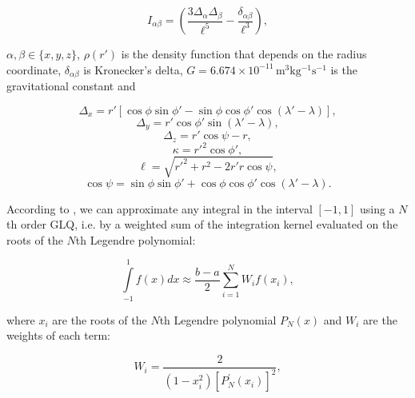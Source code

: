 \documentclass[extra]{gji}
\begin{document}
\begin{equation}
    I_{\alpha\beta} =
    \left(
        \frac{3\Delta_{\alpha} \Delta_{\beta}}{\ell^5} -
        \frac{\delta_{\alpha\beta}}{\ell^3}
    \right) ,
    \label{eq:tesseroid-tensor-kernel}
\end{equation}

\noindent $\alpha, \beta \in \{x, y, z\}$,
$\rho(r')$ is the density function that depends on the radius coordinate,
$\delta_{\alpha\beta}$ is Kronecker's delta,
$G = 6.674\times10^{-11}\, \text{m$^3$kg$^{-1}$s$^{-1}$}$ is the gravitational constant and

\begin{equation}
    \Delta_x = r'[\cos\phi\sin\phi' - \sin\phi\cos\phi'
               \cos(\lambda' - \lambda)],
\end{equation}
\begin{equation}
    \Delta_y = r' \cos \phi' \sin(\lambda' - \lambda),
\end{equation}
\begin{equation}
    \Delta_z = r' \cos \psi - r,
\end{equation}
\begin{equation}
    \kappa = {r'}^2 \cos \phi',
\end{equation}
\begin{equation}
    \ell = \sqrt{{r'}^2 + r^2 - 2 r' r \cos \psi},
\label{eq:ell}
\end{equation}
\begin{equation}
    \cos\psi = \sin\phi\sin\phi' + \cos\phi\cos\phi'
                 \cos(\lambda' - \lambda).
\label{eq:cospsi}
\end{equation}


According to \citet[p.~390]{Hildebrand1987}, we can approximate any integral in the interval $[-1, 1]$ using a $N$th order GLQ, i.e. by a weighted sum of the integration kernel evaluated on the roots of the $N$th Legendre polynomial:

\begin{equation}
    \int\limits_{-1}^1 f(x) dx \approx \frac{b-a}{2} \sum_{i=1}^N W_i f(x_i),
\end{equation}

\noindent where $x_i$ are the roots of the $N$th Legendre polynomial $P_N(x)$ and $W_i$ are the weights of each term:

\begin{equation}
    W_i = \frac{2}{(1-x_i^2)[P_N^\prime(x_i)]^2},
\end{equation}
\end{document}
